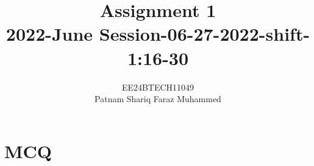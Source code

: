 \documentclass[journal]{IEEEtran}
\numberwithin{equation}{enumi}
\numberwithin{figure}{enumi}
\begin{document}


\title{Assignment 1 \\ 2022-June Session-06-27-2022-shift-1:16-30}
\author{EE24BTECH11049 \\ Patnam Shariq Faraz Muhammed}

{\let\newpage\relax\maketitle}
\section*{MCQ}
\end{document}

